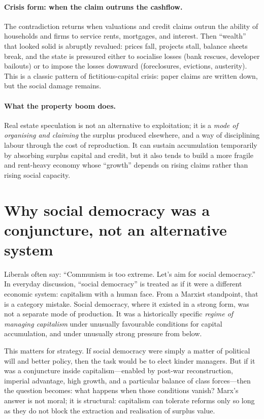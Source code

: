 \paragraph{Crisis form: when the claim outruns the cashflow.}
The contradiction returns when valuations and credit claims outrun the ability of households and firms to
service rents, mortgages, and interest. Then ``wealth'' that looked solid is abruptly revalued: prices fall,
projects stall, balance sheets break, and the state is pressured either to socialise losses (bank rescues,
developer bailouts) or to impose the losses downward (foreclosures, evictions, austerity). This is a classic
pattern of fictitious-capital crisis: paper claims are written down, but the social damage remains.

\paragraph{What the property boom does.}
Real estate speculation is not an alternative to exploitation; it is a \emph{mode of organising and claiming}
the surplus produced elsewhere, and a way of disciplining labour through the cost of reproduction. It can
sustain accumulation temporarily by absorbing surplus capital and credit, but it also tends to build a more
fragile and rent-heavy economy whose ``growth'' depends on rising claims rather than rising social capacity.


\section{Why social democracy was a conjuncture, not an alternative system}
\label{sec:socdem-conjuncture}

Liberals often say: ``Communism is too extreme. Let's aim for social democracy.'' In everyday discussion,
``social democracy'' is treated as if it were a different economic system: capitalism with a human face.
From a Marxist standpoint, that is a category mistake. Social democracy, where it existed in a strong form,
was not a separate mode of production. It was a historically specific \emph{regime of managing capitalism}
under unusually favourable conditions for capital accumulation, and under unusually strong pressure from below.

This matters for strategy. If social democracy were simply a matter of political will and better policy,
then the task would be to elect kinder managers. But if it was a conjuncture inside capitalism—enabled by
post-war reconstruction, imperial advantage, high growth, and a particular balance of class forces—then the
question becomes: what happens when those conditions vanish? Marx's answer is not moral; it is structural:
capitalism can tolerate reforms only so long as they do not block the extraction and realisation of surplus value.

